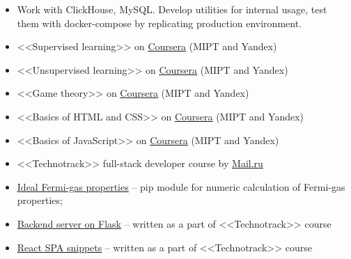 
\begin{itemize}
    \item Work with ClickHouse, MySQL. Develop utilities for internal usage, test them with docker-compose by replicating production environment.
\end{itemize}

\begin{itemize}
	\item <<Supervised learning>> on \href{https://www.coursera.org/learn/supervised-learning?specialization=machine-learning-data-analysis}{\underline{Coursera}} (MIPT and Yandex)
	\item <<Unsupervised learning>> on \href{https://www.coursera.org/learn/unsupervised-learning?specialization=machine-learning-data-analysis}{\underline{Coursera}} (MIPT and Yandex)
	\item <<Game theory>> on \href{https://www.coursera.org/learn/gametheory}{\underline{Coursera}} (MIPT and Yandex)
	\item <<Basics of HTML and CSS>> on \href{https://www.coursera.org/learn/snovy-html-i-css?specialization=razrabotka-interfeysov}{\underline{Coursera}} (MIPT and Yandex)
	\item <<Basics of JavaScript>> on \href{https://www.coursera.org/learn/javascript-osnovy-i-funktsii}{\underline{Coursera}} (MIPT and Yandex)
	\item <<Technotrack>> full-stack developer course by \href{https://track.mail.ru/}{\underline{Mail.ru}}
\end{itemize}


\begin{itemize}
    \item \href{https://github.com/alekseik1/ifg-py}{\underline{Ideal Fermi-gas properties}} -- pip module for numeric calculation of Fermi-gas properties;
    \item \href{https://github.com/alekseik1/tt-ridesharing-backend}{Backend server on Flask} -- written as a part of <<Technotrack>> course
    \item \href{https://github.com/alekseik1/2018-FS-11-Frontend-Kozharin}{React SPA snippets} -- written as a part of <<Technotrack>> course
\end{itemize}



